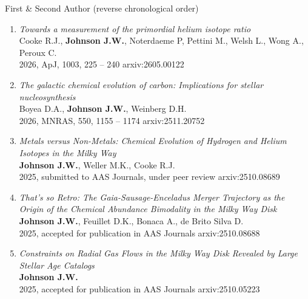 \documentclass[cv.tex]{subfiles}
\begin{document}
%
\noindent
{\color{themecolor} \large First \& Second Author}
(reverse chronological order)
\par\noindent
\begin{enumerate}

	\vspace{-3mm}

	\item \textit{Towards a measurement of the primordial helium isotope ratio}
	\\
	Cooke R.J., \textbf{Johnson J.W.}, Noterdaeme P, Pettini M., Welsh L.,
	Wong A., Peroux C.
	\\
	2026, ApJ, 1003, 225 -- 240 \hfill arxiv:2605.00122

	\item \textit{The galactic chemical evolution of carbon: Implications for
	stellar nucleosynthesis}
	\\
	Boyea D.A., \textbf{Johnson J.W.}, Weinberg D.H.
	\\
	2026, MNRAS, 550, 1155 -- 1174 \hfill arxiv:2511.20752

	\item \textit{Metals versus Non-Metals: Chemical Evolution of Hydrogen and
	Helium Isotopes in the Milky Way}
	\\
	\textbf{Johnson J.W.}, Weller M.K., Cooke R.J.
	\\
	2025, submitted to AAS Journals, under peer review \hfill arxiv:2510.08689

	\item \textit{That's so Retro: The Gaia-Sausage-Enceladus Merger Trajectory
	as the Origin of the Chemical Abundance Bimodality in the Milky Way Disk}
	\\
	\textbf{Johnson J.W.}, Feuillet D.K., Bonaca A., de Brito Silva D.
	\\
	2025, accepted for publication in AAS Journals \hfill arxiv:2510.08688

	\item \textit{Constraints on Radial Gas Flows in the Milky Way Disk
	Revealed by Large Stellar Age Catalogs}
	\\
	\textbf{Johnson J.W.}
	\\
	2025, accepted for publication in AAS Journals \hfill arxiv:2510.05223


\end{enumerate}
\end{document}
